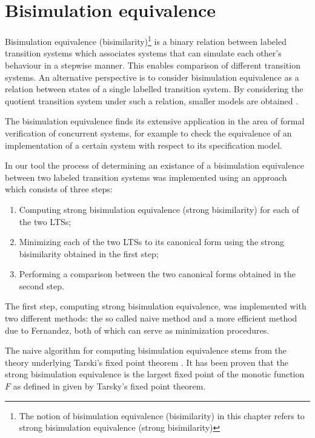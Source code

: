 \section{Bisimulation equivalence}
Bisimulation equivalence (bisimilarity)\footnote{The notion of bisimulation equivalence (bisimilarity) in this chapter 
refers to strong bisimulation equivalence (strong bisimilarity)} is a binary relation between labeled transition systems 
which associates systems that can simulate each other's behaviour in a stepwise manner. This enables comparison of 
different transition systems. An alternative perspective is to consider bisimulation equivalence as a relation between 
states of a single labelled transition system. By considering the quotient transition system under such a relation, smaller 
models are obtained \cite{ModelChecking}.

The bisimulation equivalence finds its extensive application in the area of formal verification of concurrent systems,
for example to check the equivalence of an implementation of a certain system with respect to its specification model.

In our tool the process of determining an existance of a bisimulation equivalence 
between two labeled transition systems was implemented using an approach which consists of three steps:
\begin{enumerate}
\item Computing strong bisimulation equivalence (strong bisimilarity) for each of the two LTSs;
\item Minimizing each of the two LTSs to its canonical form using the strong bisimilarity obtained
in the first step;
\item Performing a comparison between the two canonical forms obtained in the second step.
\end{enumerate}

The first step, computing strong bisimulation equivalence, was implemented with two different methods: the so called
naive method and a more efficient method due to Fernandez, both of which can serve as minimization procedures.

The naive algorithm \cite{ReactiveSystems1} for computing bisimulation equivalence stems from the theory underlying 
Tarski's fixed point theorem \cite{ReactiveSystems2}. It has been proven that the strong bisimulation equivalence is 
the largest fixed point of the monotic function $F$ as defined in \cite{ReactiveSystems1} given by Tarsky's fixed 
point theorem. 

